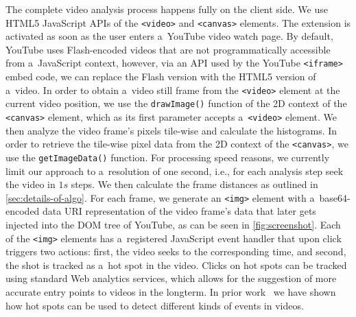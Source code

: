 The complete video analysis process happens fully on the client side. We use HTML5 JavaScript APIs of the \texttt{<video>} and \texttt{<canvas>} elements. The extension is activated as soon as the user enters a~YouTube video watch page. By default, YouTube uses Flash-encoded videos that are not programmatically accessible from a~JavaScript context, however, via an API used by the YouTube \texttt{<iframe>} embed code, we can replace the Flash version with the HTML5 version of a~video. In order to obtain a~video still frame from the \texttt{<video>} element at the current video position, we use the \texttt{drawImage()} function of the 2D context of the \texttt{<canvas>} element, which as its first parameter accepts a~\texttt{<video>} element. We then analyze the video frame's pixels tile-wise and calculate the histograms. In order to retrieve the tile-wise pixel data from the 2D context of the \texttt{<canvas>}, we use the \texttt{getImageData()} function. For processing speed reasons, we currently limit our approach to a~resolution of one second, i.e., for each analysis step seek the video in $\mathit{1s}$ steps. We then calculate the frame distances as outlined in \autoref{sec:details-of-algo}. For each frame, we generate an \texttt{<img>} element with a~base64-encoded data URI representation of the video frame's data that later gets injected into the DOM tree of YouTube, as can be seen in \autoref{fig:screenshot}. Each of the \texttt{<img>} elements has a~registered JavaScript event handler that upon click triggers two actions: first, the video seeks to the corresponding time, and second, the shot is tracked as a~hot spot in the video. Clicks on hot spots can be tracked using standard Web analytics services, which allows for the suggestion of more accurate entry points to videos in the longterm. 
In prior work~\cite{derive2011} we have shown how hot spots can be used to detect different kinds of events in videos.

